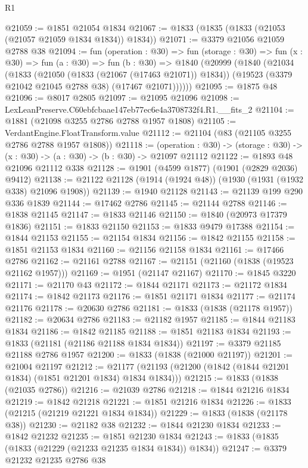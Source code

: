 \begin{lexlean}{R1}
\begin{coremodule}
@21059 := @1851 @21054 @1834
@21067 := @1833 (@1835 (@1833 (@21053 (@21057 @21059 @1834 @1834)) @1834))
@21071 := @3379 @21056 @21059 @2788 @38
@21094 := fun (operation : @30) =>
  fun (storage : @30) =>
  fun (x : @30) =>
  fun (a : @30) =>
  fun (b : @30) =>
  @1840
    (@20999
      (@1840
        (@21034
          (@1833
            (@21050 (@1833 (@21067 (@17463 @21071)) @1834))
            (@19523 (@3379 @21042 @21045 @2788 @38) (@17467 @21071))))))
@21095 := @1875 @48
@21096 := @8017 @2805
@21097 := @21095 @21096
@21098 := LexLeanPreserve.C60ebfcbaae147eb77ec6e4a3708732f4.R1.__fits_2
@21104 := @1881 (@21098 @3255 @2786 @2788 @1957 @1808)
@21105 := VerdantEngine.FloatTransform.value
@21112 := @21104 (@83 (@21105 @3255 @2786 @2788 @1957 @1808))
@21118 := (operation : @30) ->
  (storage : @30) -> (x : @30) -> (a : @30) -> (b : @30) -> @21097 @21112
@21122 := @1893 @48 @21096 @21112 @338
@21128 := @1901 (@4599 @1877) (@1901 (@2829 @2036) @9412)
@21138 := @21122 @21128 (@1914 (@1924 @48)) (@1930 (@1931 (@1932 @338) @21096 @1908))
@21139 := @1940 @21128
@21143 := @21139 @199 @290 @336 @1839
@21144 := @17462 @2786
@21145 := @21144 @2788
@21146 := @1838 @21145
@21147 := @1833 @21146
@21150 := @1840 (@20973 @17379 @1836)
@21151 := @1833 @21150
@21153 := @1833 @9479 @17388
@21154 := @1844 @21153
@21155 := @21154 @1834
@21156 := @1842 @21155
@21158 := @1851 @21153 @1834
@21160 := @21156 @21158 @1834
@21161 := @17466 @2786
@21162 := @21161 @2788
@21167 := @21151 (@21160 (@1838 (@19523 @21162 @1957)))
@21169 := @1951 (@21147 @21167)
@21170 := @1845 @3220
@21171 := @21170 @43
@21172 := @1844 @21171
@21173 := @21172 @1834
@21174 := @1842 @21173
@21176 := @1851 @21171 @1834
@21177 := @21174 @21176
@21178 := @20630 @2786
@21181 := @1833 (@1838 (@21178 @1957))
@21182 := @20634 @2786
@21183 := @21182 @1957
@21185 := @1844 @21183 @1834
@21186 := @1842 @21185
@21188 := @1851 @21183 @1834
@21193 := @1833 (@21181 (@21186 @21188 @1834 @1834))
@21197 := @3379 @21185 @21188 @2786 @1957
@21200 := @1833 (@1838 (@21000 @21197))
@21201 := @21004 @21197
@21212 := @21177 (@21193 (@21200 (@1842 (@1844 @21201 @1834) (@1851 @21201 @1834) @1834 @1834)))
@21215 := @1833 (@1838 (@21035 @2786))
@21216 := @21039 @2786
@21218 := @1844 @21216 @1834
@21219 := @1842 @21218
@21221 := @1851 @21216 @1834
@21226 := @1833 (@21215 (@21219 @21221 @1834 @1834))
@21229 := @1833 (@1838 (@21178 @38))
@21230 := @21182 @38
@21232 := @1844 @21230 @1834
@21233 := @1842 @21232
@21235 := @1851 @21230 @1834
@21243 := @1833 (@1835 (@1833 (@21229 (@21233 @21235 @1834 @1834)) @1834))
@21247 := @3379 @21232 @21235 @2786 @38

\end{coremodule}
\end{lexlean}
